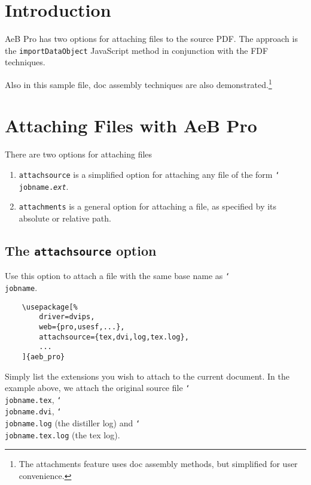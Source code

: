 \documentclass{article}
\newcommand{\cs}[1]{\texttt{\char`\\#1}}
\begin{document}
\maketitle

\tableofcontents

\section{Introduction}

AeB Pro has two options for attaching files to the source PDF. The
approach is the \texttt{import\-Data\-Object} JavaScript method in
conjunction with the FDF techniques.

Also in this sample file, doc assembly techniques are also
demonstrated.\footnote{The attachments feature uses doc assembly
methods, but simplified for user convenience.}

\section{Attaching Files with AeB Pro}

There are two options for attaching files
\begin{enumerate}
    \item \texttt{attachsource} is a simplified option for attaching
    any file of the form \cs{jobname.}\texttt{\textsl{ext}}.

    \item \texttt{attachments} is a general option for attaching a
    file, as specified by its absolute or relative path.
\end{enumerate}

\subsection{The \texttt{attachsource} option}

Use this option to attach a file with the same base name as \cs{jobname}.

\begin{Verbatim}
    \usepackage[%
        driver=dvips,
        web={pro,usesf,...},
        attachsource={tex,dvi,log,tex.log},
        ...
    ]{aeb_pro}
\end{Verbatim}
Simply list the extensions you wish to attach to the current
document. In the example above, we attach the original source file
\cs{jobname.tex}, \cs{jobname.dvi},  \cs{jobname.log} (the distiller
log) and \cs{jobname.tex.log} (the tex log).
\end{document}
